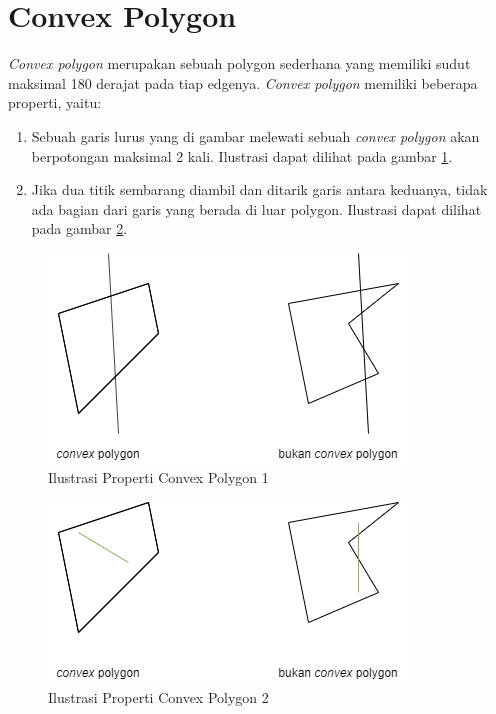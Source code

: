 \section{ Convex Polygon}
\textit{Convex polygon} merupakan sebuah polygon sederhana yang memiliki sudut maksimal 180 derajat pada tiap edgenya. \textit{Convex polygon} memiliki beberapa properti, yaitu:
\begin{enumerate}
    \item Sebuah garis lurus yang di gambar melewati sebuah \textit{convex polygon} akan berpotongan maksimal 2 kali. Ilustrasi dapat dilihat pada gambar \ref{fig:ilustrasi-properti-convex-polygon-1}.
    \item Jika dua titik sembarang diambil dan ditarik garis antara keduanya, tidak ada bagian dari garis yang berada di luar polygon. Ilustrasi dapat dilihat pada gambar \ref{fig:ilustrasi-properti-convex-polygon-2}.
\end{enumerate}
\begin{figure}[!h]
    \Centering
    \includegraphics[width=0.5\columnwidth]{bab2/img/ilustrasi-properti-convex-polygon-1}
    \caption{Ilustrasi Properti Convex Polygon 1}
    \label{fig:ilustrasi-properti-convex-polygon-1}
\end{figure}
\begin{figure}[!h]
    \Centering
    \includegraphics[width=0.5\columnwidth]{bab2/img/ilustrasi-properti-convex-polygon-2}
    \caption{Ilustrasi Properti Convex Polygon 2}
    \label{fig:ilustrasi-properti-convex-polygon-2}
\end{figure}

